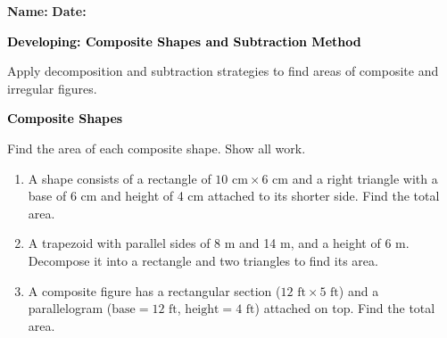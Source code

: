 \documentclass[12pt, letterpaper, fleqn]{article}
\begin{document}
\textbf{Name:} \underline{\hspace{5cm}}
\hfill
\textbf{Date:} \underline{\hspace{3cm}}\\

\begin{tcolorbox}[colback=black!10]
    \large\textcolor{black}{\textbf{Developing: Composite Shapes and Subtraction Method}}
\end{tcolorbox}

\vspace{3mm}

\noindent
Apply decomposition and subtraction strategies to find areas of composite and irregular figures.

\vspace{4mm}

\begin{tcolorbox}[colback=black!10]
\large\textcolor{black}{\textbf{Composite Shapes}}
\end{tcolorbox}

\noindent
Find the area of each composite shape. Show all work.

\vspace{3mm}

\begin{enumerate}[itemsep=1.5cm, leftmargin=0.6cm]

\item A shape consists of a rectangle of $10\text{ cm} \times 6\text{ cm}$ and a right triangle with a base of 6 cm and height of 4 cm attached to its shorter side. Find the total area.

\vspace{2cm}

\item A trapezoid with parallel sides of 8 m and 14 m, and a height of 6 m. Decompose it into a rectangle and two triangles to find its area.

\vspace{2cm}

\item A composite figure has a rectangular section ($12\text{ ft} \times 5\text{ ft}$) and a parallelogram ($\text{base} = 12\text{ ft}$, $\text{height} = 4\text{ ft}$) attached on top. Find the total area.

\vspace{2cm}

\end{enumerate}
\end{document}
